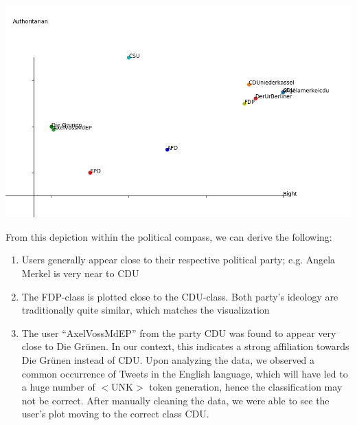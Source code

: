 \documentclass[10pt, oneside]{article}
\newenvironment{Figure}
	{\par\medskip\noindent\minipage{\linewidth}}
	{\endminipage\par\medskip}
\begin{document}
\begin{multicols}{2}
\begin{Figure}
	\centering
	\includegraphics[width=\linewidth]{images/Political_Compass.png}
\end{Figure}



From this depiction within the political compass, we can derive the following:

\begin{enumerate}
	\item Users generally appear close to their respective political party; e.g. Angela Merkel is very near to CDU
	\item The FDP-class is plotted close to the CDU-class. Both party's ideology are traditionally quite similar, which matches the visualization
	\item The user ``AxelVossMdEP'' from the party CDU was found to appear very close to Die Grünen. In our context, this indicates a strong affiliation towards Die Grünen instead of CDU. Upon analyzing the data, we observed a common occurrence  of Tweets in the English language, which will have led to a huge number of $<$UNK$>$ token generation, hence the classification may not be correct. After manually cleaning the data, we were able to see the user's plot moving to the correct class CDU.
\end{enumerate}


\end{multicols}
\end{document}
